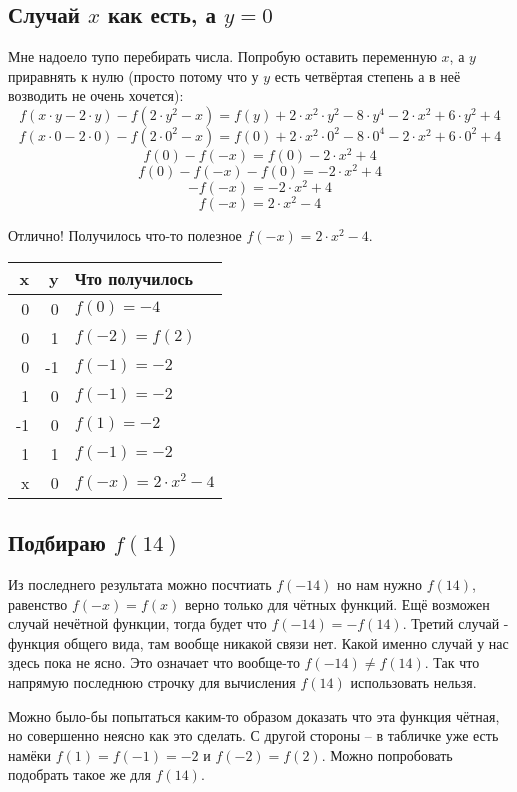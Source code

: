 \documentclass{article}
\begin{document}
\subsection{Случай $x$ как есть, а $y=0$}
Мне надоело тупо перебирать числа. Попробую оставить переменную $x$, а $y$ приравнять к нулю (просто потому что у $y$ есть четвёртая степень а в неё возводить не очень хочется):
$$f(x\cdot{}y-2\cdot{}y)-f(2\cdot{}y^2-x)=f(y)+2\cdot{}x^2\cdot{}y^2-8\cdot{}y^4-2\cdot{}x^2+6\cdot{}y^2+4$$
$$f(x\cdot{}0-2\cdot{}0)-f(2\cdot{}0^2-x)=f(0)+2\cdot{}x^2\cdot{}0^2-8\cdot{}0^4-2\cdot{}x^2+6\cdot{}0^2+4$$
$$f(0)-f(-x)=f(0)-2\cdot{}x^2+4$$
$$f(0)-f(-x)-f(0)=-2\cdot{}x^2+4$$
$$-f(-x)=-2\cdot{}x^2+4$$
$$f(-x)=2\cdot{}x^2-4$$

\begin{samepage}
Отлично! Получилось что-то полезное {\boldmath\color{red}$f(-x)=2\cdot{}x^2-4$}.
\begin{center}
 \begin{tabular}{r r l} 
 \hline
 x & y & Что получилось        \\
 \hline
  0 &  0 & $f(0)=-4$           \\
  0 &  1 & $f(-2)=f(2)$        \\
  0 & -1 & $f(-1)=-2$          \\
  1 &  0 & $f(-1)=-2$          \\
 -1 &  0 & $f(1)=-2$           \\
  1 &  1 & $f(-1)=-2$          \\
  x &  0 & $f(-x)=2\cdot{}x^2-4$ \\
  \hline
 \end{tabular}
\end{center}
\end{samepage}

\subsection{Подбираю $f(14)$}
Из последнего результата можно посчтиать $f(-14)$ но нам нужно $f(14)$, равенство $f(-x)=f(x)$ верно только для чётных функций. Ещё возможен случай нечётной функции, тогда будет что $f(-14)=-f(14)$. Третий случай - функция общего вида, там вообще никакой связи нет. Какой именно случай у нас здесь пока не ясно. Это означает что вообще-то $f(-14) \ne{} f(14)$. Так что напрямую последнюю строчку для вычисления $f(14)$ использовать нельзя.

Можно было-бы попытаться каким-то образом доказать что эта функция чётная, но совершенно неясно как это сделать. С другой стороны -- в табличке уже есть намёки $f(1)=f(-1)=-2$ и $f(-2)=f(2)$. Можно попробовать подобрать такое же для $f(14)$.
\end{document}
